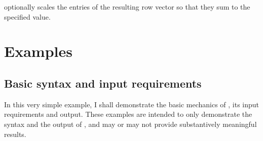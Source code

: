 \hangpara
     optionally scales the entries of
    the resulting row vector so that they sum to the specified value.





\section{Examples}
\label{sec:examples}

\subsection{Basic syntax and input requirements}
\label{subsec:basic}

In this very simple example, I shall demonstrate the basic mechanics of
, its input requirements and output. 
These examples are intended to only demonstrate the syntax 
and the output of , and may or may not provide
substantively meaningful results.


